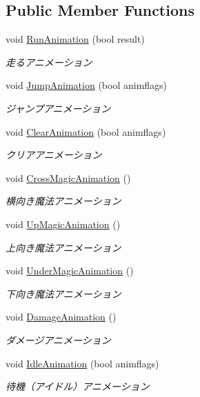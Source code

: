 \subsection*{Public Member Functions}
\begin{DoxyCompactItemize}
\item 
void \hyperlink{class_player_animation_a9d2e95bbf85077927c96fd48c07b7d91}{Run\+Animation} (bool result)
\begin{DoxyCompactList}\small\item\em 走るアニメーション \end{DoxyCompactList}\item 
void \hyperlink{class_player_animation_acaddf95b458f156aa80c82f6d41750fd}{Jump\+Animation} (bool animflags)
\begin{DoxyCompactList}\small\item\em ジャンプアニメーション \end{DoxyCompactList}\item 
void \hyperlink{class_player_animation_a2cd568277cb0fafca136ab727ef4e1ce}{Clear\+Animation} (bool animflags)
\begin{DoxyCompactList}\small\item\em クリアアニメーション \end{DoxyCompactList}\item 
void \hyperlink{class_player_animation_a3241d3465f0dd71e9692acfb23560432}{Cross\+Magic\+Animation} ()
\begin{DoxyCompactList}\small\item\em 横向き魔法アニメーション \end{DoxyCompactList}\item 
void \hyperlink{class_player_animation_a5e13800596dcf4cb95379c50746e4586}{Up\+Magic\+Animation} ()
\begin{DoxyCompactList}\small\item\em 上向き魔法アニメーション \end{DoxyCompactList}\item 
void \hyperlink{class_player_animation_ad6c513194c0f9b74d99093dad05826cb}{Under\+Magic\+Animation} ()
\begin{DoxyCompactList}\small\item\em 下向き魔法アニメーション \end{DoxyCompactList}\item 
void \hyperlink{class_player_animation_a1f857cd924289c430cc5f158ae53e91f}{Damage\+Animation} ()
\begin{DoxyCompactList}\small\item\em ダメージアニメーション \end{DoxyCompactList}\item 
void \hyperlink{class_player_animation_ab9d35f9c0315046476b8c59dd1422231}{Idle\+Animation} (bool animflags)
\begin{DoxyCompactList}\small\item\em 待機（アイドル）アニメーション \end{DoxyCompactList}\end{DoxyCompactItemize}
